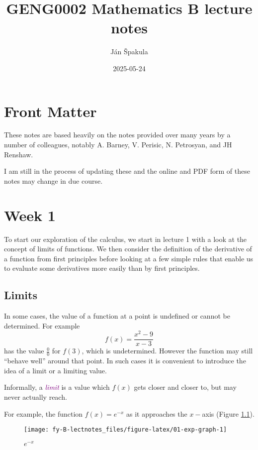 \documentclass[
  english,
  11pt,
  oneside]{book}
\title{GENG0002 Mathematics B lecture notes}
\author{Ján Špakula}
\date{2025-05-24}
\newcommand{\slide}{}
\theoremstyle{definition}
\theoremstyle{definition}
\theoremstyle{definition}
\theoremstyle{definition}
\theoremstyle{remark}
\begin{document}
\maketitle

{
\setcounter{tocdepth}{1}
\tableofcontents
}
\chapter*{Front Matter}\label{front-matter}

These notes are based heavily on the notes provided over many years by a number of colleagues, notably A. Barney, V. Perisic, N. Petrosyan, and JH Renshaw.

I am still in the process of updating these and the online and PDF form of these notes may change in due course.

\chapter{Week 1}\label{week-one}

To start our exploration of the calculus, we start in lecture 1 with a look at the concept of limits of functions. We then consider the definition of the derivative of a function from first principles before looking at a few simple rules that enable us to evaluate some derivatives more easily than by first principles.
\slide

\section{Limits}\label{lecture-one}

In some cases, the value of a function at a point is undefined or cannot be determined. For example
\[
f(x) = \frac{x^2-9}{x-3}\tag{1}
\]
has the value \(\frac00\) for \(f(3)\), which is undetermined. However the function may still ``behave well'' around that point. In such cases it is convenient to introduce the idea of a limit or a limiting value.

Informally, a \textcolor{purple}{\em limit} is a value which \(f(x)\) gets closer and closer to, but may never actually reach.

\slide

For example, the function \(f(x) = e^{-x}\) as it approaches the \(x-\)axis (Figure \ref{fig:01-exp-graph}).

\begin{figure}

{\centering \texttt{[image: fy-B-lectnotes\_files/figure-latex/01-exp-graph-1]} 

}

\caption{$e^{-x}$}\label{fig:01-exp-graph}
\end{figure}
\end{document}
